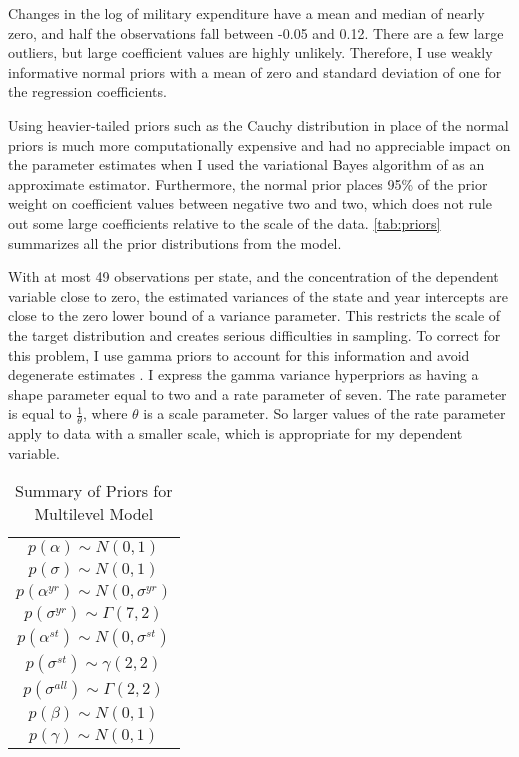 \documentclass[12pt]{article}
\begin{document}
Changes in the log of military expenditure have a mean and median of nearly zero, and half the observations fall between -0.05 and 0.12. There are a few large outliers, but large coefficient values are highly unlikely. Therefore, I use weakly informative normal priors with a mean of zero and standard deviation of one for the regression coefficients. 

Using heavier-tailed priors such as the Cauchy distribution in place of the normal priors is much more computationally expensive and had no appreciable impact on the parameter estimates when I used the variational Bayes algorithm of \citep{Kucukelbiretal2015} as an approximate estimator. Furthermore, the normal prior places 95\% of the prior weight on coefficient values between negative two and two, which does not rule out some large coefficients relative to the scale of the data. \autoref{tab:priors} summarizes all the prior distributions from the model. 

With at most 49 observations per state, and the concentration of the dependent variable close to zero, the estimated variances of the state and year intercepts are close to the zero lower bound of a variance parameter. This restricts the scale of the target distribution and creates serious difficulties in sampling. To correct for this problem, I use gamma priors to account for this information and avoid degenerate estimates \citep{Chungetal2013}. I express the gamma variance hyperpriors as having a shape parameter equal to two and a rate parameter of seven. The rate parameter is equal to $\frac{1}{\theta}$, where $\theta$ is a scale parameter. So larger values of the rate parameter apply to data with a smaller scale, which is appropriate for my dependent variable. 


\begin{table} %

 \begin{center}
\begin{tabular}{c} 
$ p(\alpha) \sim N(0, 1)$  \\
$ p(\sigma) \sim N(0, 1) $ \\
$ p(\alpha^{yr}) \sim N(0, \sigma^{yr}) $ \\ 
$ p(\sigma^{yr}) \sim \Gamma(7, 2) $ \\
$ p(\alpha^{st}) \sim N(0, \sigma^{st}) $ \\ 
$ p(\sigma^{st}) \sim \gamma(2, 2) $ \\ 
$ p(\sigma^{all}) \sim \Gamma(2, 2) $ \\
$ p(\beta) \sim N(0, 1) $\\
$ p(\gamma) \sim N(0, 1) $ 
\end{tabular} 
\end{center} 

\caption{Summary of Priors for Multilevel Model}
\label{tab:priors}
\end{table} 
\end{document}
